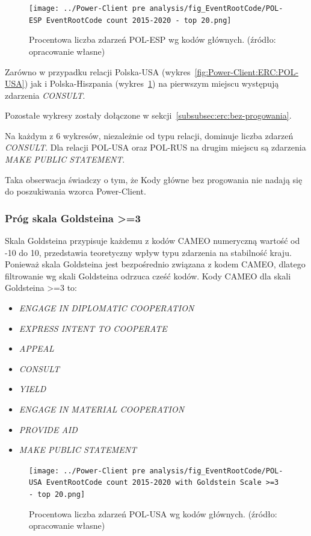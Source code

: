 \documentclass[11pt]{report}
\begin{document}
    \begin{figure}[!htp]
        \centering
        \texttt{[image: ../Power-Client pre analysis/fig\_EventRootCode/POL-ESP EventRootCode count 2015-2020 - top 20.png]}
        \caption{Procentowa liczba zdarzeń POL-ESP wg kodów głównych. (źródło: opracowanie własne)}
        \label{fig:Power-Client:ERC:POL-ESP}
    \end{figure}

    Zarówno w przypadku relacji Polska-USA (wykres~\ref{fig:Power-Client:ERC:POL-USA}) jak i Polska-Hiszpania (wykres~\ref{fig:Power-Client:ERC:POL-ESP})
    na pierwszym miejscu występują zdarzenia \textit{CONSULT}.

    Pozostałe wykresy zostały dołączone w sekcji~\ref{subsubsec:erc:bez-progowania}.

    Na każdym z 6 wykresów, niezależnie od typu relacji, dominuje liczba zdarzeń \textit{CONSULT}.
    Dla relacji POL-USA oraz POL-RUS na drugim miejscu są zdarzenia \textit{MAKE PUBLIC STATEMENT}.

    Taka obserwacja świadczy o tym, że Kody główne bez progowania nie nadają się do poszukiwania wzorca Power-Client.

    \subsubsection{Próg skala Goldsteina >=3}
    Skala Goldsteina przypisuje każdemu z kodów CAMEO numeryczną wartość od -10 do 10, przedstawia teoretyczny wpływ typu zdarzenia na stabilność kraju.
    Ponieważ skala Goldsteina jest bezpośrednio związana z kodem CAMEO, dlatego filtrowanie wg skali Goldsteina odrzuca cześć kodów.
    Kody CAMEO dla skali Goldsteina >=3 to:
    \begin{itemize}
        \item \textit{ENGAGE IN DIPLOMATIC COOPERATION}
        \item \textit{EXPRESS INTENT TO COOPERATE}
        \item \textit{APPEAL}
        \item \textit{CONSULT}
        \item \textit{YIELD}
        \item \textit{ENGAGE IN MATERIAL COOPERATION}
        \item \textit{PROVIDE AID}
        \item \textit{MAKE PUBLIC STATEMENT}
    \end{itemize}

    \begin{figure}[!htp]
        \centering
        \texttt{[image: ../Power-Client pre analysis/fig\_EventRootCode/POL-USA EventRootCode count 2015-2020 with Goldstein Scale >=3 - top 20.png]}
        \caption{Procentowa liczba zdarzeń POL-USA wg kodów głównych. (źródło: opracowanie własne)}
        \label{fig:Power-Client:ERC:Goldstein:POL-USA}
    \end{figure}
\end{document}
